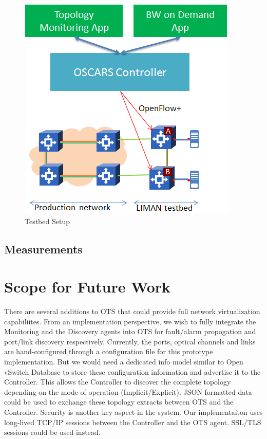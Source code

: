 \documentclass{sig-alternate-10pt}
\begin{document}
	\begin{figure}[htb]
	\centering
	\includegraphics[scale=0.50]{LIMAN.png}
	\caption{Testbed Setup}
	\label{fig:LIMAN}
	\end{figure}

	\subsection{Measurements}
	\label{sec:measure}

\section{Scope for Future Work}
\label{sec:future}
	There are several additions to OTS that could provide full network virtualization capabiliites. From an
	implementation perspective, we wish to fully integrate the Monitoring and the Discovery agents into
	OTS for fault/alarm propogation and port/link discovery respectively. Currently, the ports, optical 
	channels and links are hand-configured through a configuration file for this prototype implementation.
	But we would need a dedicated info model similar to Open vSwitch Database \cite{ovsdb} to store
	these configuration information and advertise it to the Controller. This allows the Controller to discover
	the complete topology depending on the mode of operation (Implicit/Explicit). JSON formatted data 
	could be used to exchange these topology extracts between OTS and the Controller. Security is another
	key aspect in the system. Our implementaiton uses long-lived TCP/IP sessions between the Controller
	and the OTS agent. SSL/TLS sessions could be used instead.
\end{document}
